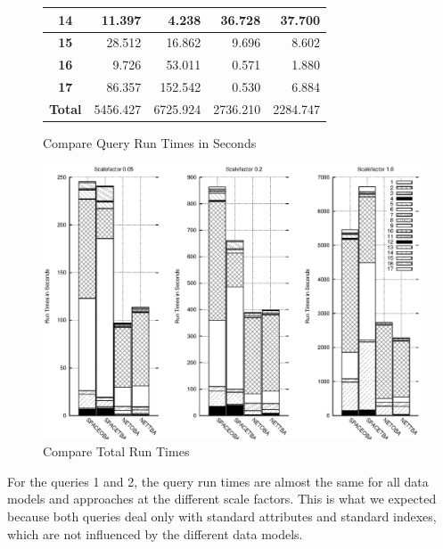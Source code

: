 \documentclass[a4paper]{article}
\begin{document}
{\begin{figure}[h]
\begin{minipage}{0.5\linewidth}
\begin{tiny}
\begin{tabular}{|c|r|r|r|r|}
        \hline
        \textbf{14}&11.397&4.238&36.728&37.700\\
        \hline
        \textbf{15}&28.512&16.862&9.696&8.602\\
        \hline
        \textbf{16}&9.726&53.011&0.571&1.880\\
        \hline
        \textbf{17}&86.357&152.542&0.530&6.884\\
        \hline
        \textbf{Total}&5456.427&6725.924&2736.210&2284.747\\
        \hline
      \end{tabular}
    \end{tiny}
  \end{minipage}
 \caption{Compare Query Run Times in Seconds}
 \label{fig:compruntimes}
\end{figure}
\begin{figure}
  \includegraphics[width=1.0\linewidth]{compruntimesall.eps}
  \caption{Compare Total Run Times}
  \label{fig:CompTotalRunTimesGraphic}
\end{figure}

For the queries 1 and 2, the query run times are almost the same for all data models
and approaches at the different scale factors. This is what we expected because
both queries deal only with standard attributes and standard indexes, which
are not influenced by the different data models.

}
\end{document}
